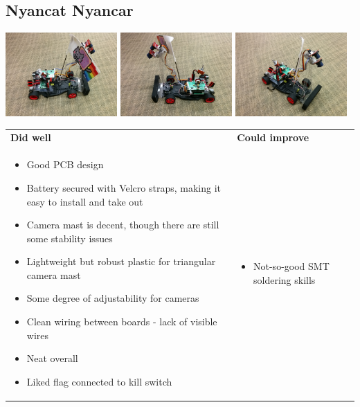 \documentclass{article}
\begin{document}
\subsection{Nyancat Nyancar}
{\centering
\includegraphics[width=0.32\textwidth]{images-dis2-carcritiques/nandcar-side1}
\includegraphics[width=0.32\textwidth]{images-dis2-carcritiques/nandcar-side2}
\includegraphics[width=0.32\textwidth]{images-dis2-carcritiques/nandcar-angle} \\}

\begin{tabularx}{\textwidth}{X X}
\textbf{Did well} & \textbf{Could improve} \\
\begin{itemize}
  \item Good PCB design
  \item Battery secured with Velcro straps, making it easy to install and take out
  \item Camera mast is decent, though there are still some stability issues
  \item Lightweight but robust plastic for triangular camera mast
  \item Some degree of adjustability for cameras
  \item Clean wiring between boards - lack of visible wires
  \item Neat overall
  \item Liked flag connected to kill switch
\end{itemize}
&
\begin{itemize}
  \item Not-so-good SMT soldering skills
\end{itemize}
\end{tabularx}
\end{document}

